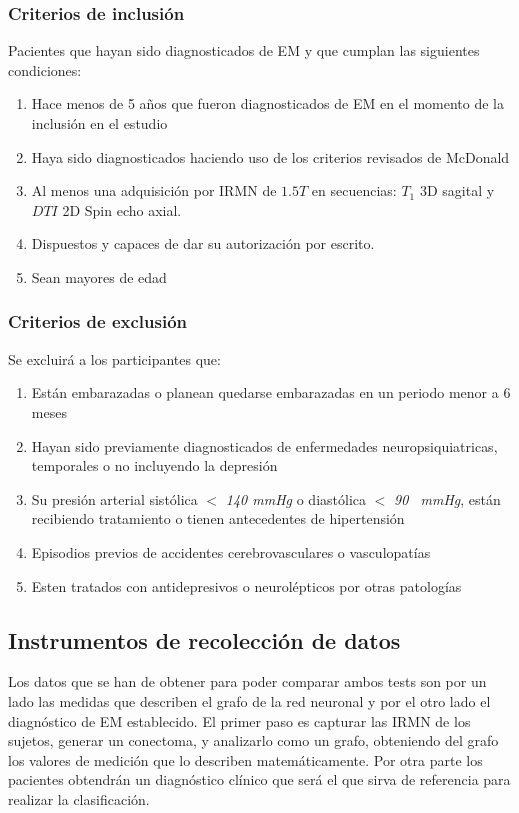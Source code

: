\documentclass[fleqn,12pt]{UICArticle} %
\begin{document}
\subsubsection{Criterios de inclusión}
Pacientes que hayan sido diagnosticados de EM y que cumplan las siguientes condiciones:
\begin{enumerate}[noitemsep]
\item Hace menos de 5 años que fueron diagnosticados de EM en el momento de la inclusión en el estudio
\item Haya sido diagnosticados haciendo uso de los criterios revisados de McDonald
\item Al menos una adquisición por IRMN de $1.5T$ en secuencias: $T_1$ 3D sagital y $DTI$ 2D Spin echo axial.
\item Dispuestos y capaces de dar su autorización por escrito.
\item Sean mayores de edad
\end{enumerate}

\subsubsection{Criterios de exclusión}
Se excluirá a los participantes que:
\begin{enumerate}[noitemsep]
\item Están embarazadas o planean quedarse embarazadas en un periodo menor a 6 meses
\item Hayan sido previamente diagnosticados de enfermedades neuropsiquiatricas, temporales o no incluyendo la depresión
\item Su presión arterial sistólica $<$ \textit{140 mmHg} o diastólica $<$ \textit{90 ~mmHg}, están recibiendo tratamiento o tienen antecedentes de hipertensión
\item Episodios previos de accidentes cerebrovasculares o vasculopatías
\item Esten tratados con antidepresivos o neurolépticos por otras patologías
\end{enumerate}


\subsection{Instrumentos de recolección de datos}

Los datos que se han de obtener para poder comparar ambos tests son por un lado las medidas que describen el grafo de la red neuronal y por el otro lado el diagnóstico de EM establecido. El primer paso es capturar las IRMN de los sujetos, generar un conectoma, y analizarlo como un grafo, obteniendo del grafo los valores de medición que lo describen matemáticamente. Por otra parte los pacientes obtendrán un diagnóstico clínico que será el que sirva de referencia para realizar la clasificación.
\end{document}
